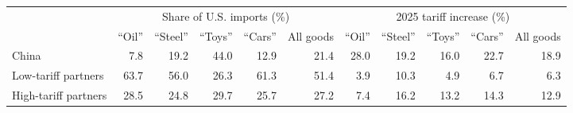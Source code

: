 \begin{tabular}{lrrrrrrrrrr}
\toprule
 & \multicolumn{5}{c}{Share of U.S. imports (\%)} & \multicolumn{5}{c}{2025 tariff increase (\%)} \\
\cmidrule(lr){2-6}\cmidrule(lr){7-11}
 & ``Oil'' & ``Steel'' & ``Toys'' & ``Cars'' & All goods & ``Oil'' & ``Steel'' & ``Toys'' & ``Cars'' & All goods \\
\midrule
China & 7.8 & 19.2 & 44.0 & 12.9 & 21.4 & 28.0 & 19.2 & 16.0 & 22.7 & 18.9 \\
Low-tariff partners & 63.7 & 56.0 & 26.3 & 61.3 & 51.4 & 3.9 & 10.3 & 4.9 & 6.7 & 6.3 \\
High-tariff partners & 28.5 & 24.8 & 29.7 & 25.7 & 27.2 & 7.4 & 16.2 & 13.2 & 14.3 & 12.9 \\
\bottomrule
\end{tabular}
